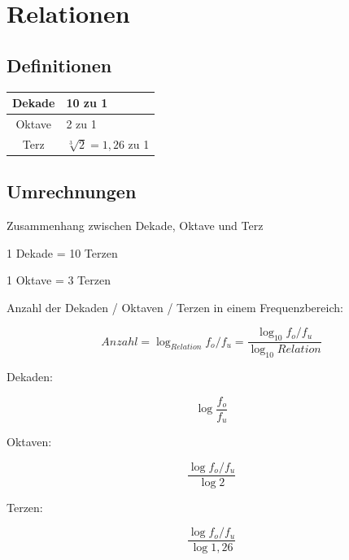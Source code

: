 \documentclass[a4paper, 12pt]{report}
\begin{document}
\section*{Relationen}

	\subsection*{Definitionen}
	
	\begin{center}
		\begin{tabular}{|c|l|}
			\hline Dekade & 10 zu 1 \\ 
			\hline Oktave & 2 zu 1 \\ 
			\hline Terz & $ \sqrt[3]{2} = 1,26 $ zu 1 \\ 
			\hline 
		\end{tabular}
	\end{center}
	
	\subsection*{Umrechnungen}
	
	Zusammenhang zwischen Dekade, Oktave und Terz
	
	\begin{center}
		1 Dekade = 10 Terzen
		
		1 Oktave = 3 Terzen
	\end{center}
	
	Anzahl der Dekaden / Oktaven / Terzen in einem Frequenzbereich:
	
	\[
 		Anzahl = \log_{Relation}{f_o / f_u} = \frac{\log_{10}{f_o / f_u}}{\log_{10}{Relation}}
	\]
	
	\vspace{0.5cm}

	\begin{minipage}[t]{0.3\textwidth}
		\begin{center}
			Dekaden:
		\end{center}
		\[ \log \frac{f_o}{f_u} \]
	\end{minipage}
	\begin{minipage}[t]{0.3\textwidth}
		\begin{center}
			Oktaven:
		\end{center}
		\[ \frac{\log f_o / f_u}{\log 2} \]
	\end{minipage}
	\begin{minipage}[t]{0.3\textwidth}
		\begin{center}
			Terzen:
		\end{center}
		\[ \frac{\log f_o / f_u}{\log 1,26} \]
	\end{minipage}
	
\end{document}
